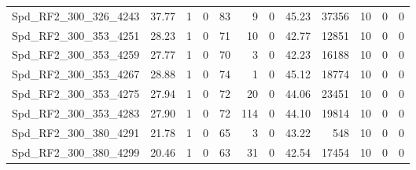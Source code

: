 \begin{longtable}[c]{@{}lrrrrrrrrrrr@{}}
Spd\_RF2\_300\_326\_4243     & 37.77                  & 1                       & 0                       & 83                     & 9                       & 0                       & 45.23                   & 37356                    & 10                       & 0                        & 0                        \\
Spd\_RF2\_300\_353\_4251     & 28.23                  & 1                       & 0                       & 71                     & 10                      & 0                       & 42.77                   & 12851                    & 10                       & 0                        & 0                        \\
Spd\_RF2\_300\_353\_4259     & 27.77                  & 1                       & 0                       & 70                     & 3                       & 0                       & 42.23                   & 16188                    & 10                       & 0                        & 0                        \\
Spd\_RF2\_300\_353\_4267     & 28.88                  & 1                       & 0                       & 74                     & 1                       & 0                       & 45.12                   & 18774                    & 10                       & 0                        & 0                        \\
Spd\_RF2\_300\_353\_4275     & 27.94                  & 1                       & 0                       & 72                     & 20                      & 0                       & 44.06                   & 23451                    & 10                       & 0                        & 0                        \\
Spd\_RF2\_300\_353\_4283     & 27.90                  & 1                       & 0                       & 72                     & 114                     & 0                       & 44.10                   & 19814                    & 10                       & 0                        & 0                        \\
Spd\_RF2\_300\_380\_4291     & 21.78                  & 1                       & 0                       & 65                     & 3                       & 0                       & 43.22                   & 548                      & 10                       & 0                        & 0                        \\
Spd\_RF2\_300\_380\_4299     & 20.46                  & 1                       & 0                       & 63                     & 31                      & 0                       & 42.54                   & 17454                    & 10                       & 0                        & 0                        \\

\end{longtable}
